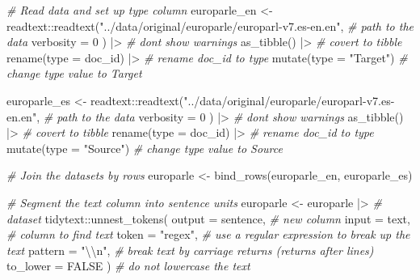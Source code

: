 \documentclass[
  letterpaper,
  DIV=11,
  numbers=noendperiod]{scrreport}
\newenvironment{Shaded}{\begin{snugshade}}{\end{snugshade}}
\newcommand{\AttributeTok}[1]{\textcolor[rgb]{0.00,0.00,0.00}{#1}}
\newcommand{\CommentTok}[1]{\textcolor[rgb]{0.00,0.00,0.00}{\textit{#1}}}
\newcommand{\ConstantTok}[1]{\textcolor[rgb]{0.00,0.00,0.00}{#1}}
\newcommand{\DecValTok}[1]{\textcolor[rgb]{0.00,0.00,0.00}{#1}}
\newcommand{\FunctionTok}[1]{\textcolor[rgb]{0.00,0.00,0.00}{#1}}
\newcommand{\NormalTok}[1]{\textcolor[rgb]{0.00,0.00,0.00}{#1}}
\newcommand{\OtherTok}[1]{\textcolor[rgb]{0.00,0.00,0.00}{#1}}
\newcommand{\SpecialCharTok}[1]{\textcolor[rgb]{0.00,0.00,0.00}{#1}}
\newcommand{\StringTok}[1]{\textcolor[rgb]{0.00,0.00,0.00}{#1}}
\theoremstyle{definition}
\theoremstyle{remark}
\begin{document}
\begin{Shaded}
\begin{Highlighting}[]
\CommentTok{\# Read data and set up \textasciigrave{}type\textasciigrave{} column}
\NormalTok{europarle\_en }\OtherTok{\textless{}{-}}
\NormalTok{  readtext}\SpecialCharTok{::}\FunctionTok{readtext}\NormalTok{(}\StringTok{"../data/original/europarle/europarl{-}v7.es{-}en.en"}\NormalTok{, }\CommentTok{\# path to the data}
    \AttributeTok{verbosity =} \DecValTok{0}
\NormalTok{  ) }\SpecialCharTok{|\textgreater{}} \CommentTok{\# don\textquotesingle{}t show warnings}
  \FunctionTok{as\_tibble}\NormalTok{() }\SpecialCharTok{|\textgreater{}} \CommentTok{\# covert to tibble}
  \FunctionTok{rename}\NormalTok{(}\AttributeTok{type =}\NormalTok{ doc\_id) }\SpecialCharTok{|\textgreater{}} \CommentTok{\# rename doc\_id to type}
  \FunctionTok{mutate}\NormalTok{(}\AttributeTok{type =} \StringTok{"Target"}\NormalTok{) }\CommentTok{\# change type value to \textquotesingle{}Target\textquotesingle{}}

\NormalTok{europarle\_es }\OtherTok{\textless{}{-}}
\NormalTok{  readtext}\SpecialCharTok{::}\FunctionTok{readtext}\NormalTok{(}\StringTok{"../data/original/europarle/europarl{-}v7.es{-}en.en"}\NormalTok{, }\CommentTok{\# path to the data}
    \AttributeTok{verbosity =} \DecValTok{0}
\NormalTok{  ) }\SpecialCharTok{|\textgreater{}} \CommentTok{\# don\textquotesingle{}t show warnings}
  \FunctionTok{as\_tibble}\NormalTok{() }\SpecialCharTok{|\textgreater{}} \CommentTok{\# covert to tibble}
  \FunctionTok{rename}\NormalTok{(}\AttributeTok{type =}\NormalTok{ doc\_id) }\SpecialCharTok{|\textgreater{}} \CommentTok{\# rename doc\_id to type}
  \FunctionTok{mutate}\NormalTok{(}\AttributeTok{type =} \StringTok{"Source"}\NormalTok{) }\CommentTok{\# change type value to \textquotesingle{}Source\textquotesingle{}}

\CommentTok{\# Join the datasets by rows}
\NormalTok{europarle }\OtherTok{\textless{}{-}}
  \FunctionTok{bind\_rows}\NormalTok{(europarle\_en, europarle\_es)}

\CommentTok{\# Segment the \textasciigrave{}text\textasciigrave{} column into \textasciigrave{}sentence\textasciigrave{} units}
\NormalTok{europarle }\OtherTok{\textless{}{-}}
\NormalTok{  europarle }\SpecialCharTok{|\textgreater{}} \CommentTok{\# dataset}
\NormalTok{  tidytext}\SpecialCharTok{::}\FunctionTok{unnest\_tokens}\NormalTok{(}
    \AttributeTok{output =}\NormalTok{ sentence, }\CommentTok{\# new column}
    \AttributeTok{input =}\NormalTok{ text, }\CommentTok{\# column to find text}
    \AttributeTok{token =} \StringTok{"regex"}\NormalTok{, }\CommentTok{\# use a regular expression to break up the text}
    \AttributeTok{pattern =} \StringTok{"}\SpecialCharTok{\textbackslash{}\textbackslash{}}\StringTok{n"}\NormalTok{, }\CommentTok{\# break text by carriage returns (returns after lines)}
    \AttributeTok{to\_lower =} \ConstantTok{FALSE}
\NormalTok{  ) }\CommentTok{\# do not lowercase the text}


\end{Highlighting}
\end{Shaded}
\end{document}
